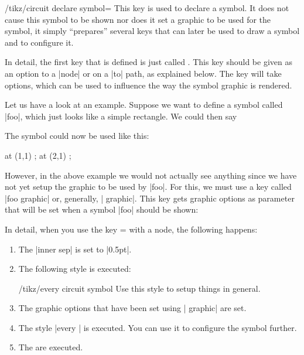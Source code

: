 \begin{key}{/tikz/circuit declare symbol=}
  This key is used to declare a symbol. It does not cause this symbol
  to be shown nor does it set a graphic to be used for the symbol, it
  simply ``prepares'' several keys that can later be used to draw a
  symbol and to configure it.

  In detail, the first key that is defined is just called
  . This key should be given as an option to a |node| or on
  a |to| path, as explained below. The key will take options, which
  can be used to influence the way the symbol graphic is rendered.

  Let us have a look at an example. Suppose we want to define a symbol
  called |foo|, which just looks like a simple rectangle. We could
  then say
\begin{codeexample}
\tikzset{circuit declare symbol=foo}
\end{codeexample}
  The symbol could now be used like this:
\begin{codeexample}
  \node [foo]       at (1,1) {};
  \node [foo={red}] at (2,1) {};
\end{codeexample}

  However, in the above example we would not actually see anything
  since we have not yet setup the graphic to be used by |foo|. For
  this, we must use a key called |foo graphic| or, generally,
  | graphic|. This key gets graphic options as parameter
  that will be set when a symbol |foo| should be shown:
\begin{codeexample}[]
\end{codeexample}

  In detail, when you use the key = with a
  node, the following happens:
  \begin{enumerate}
  \item The |inner sep| is set to |0.5pt|.
  \item The following style is executed:
    \begin{stylekey}{/tikz/every circuit symbol}
      Use this style to setup things in general.
    \end{stylekey}
  \item The graphic options that have been set using
    | graphic| are set.
  \item The style |every | is executed. You can use it to
    configure the symbol further.
  \item The  are executed.
  \end{enumerate}


\end{key}
